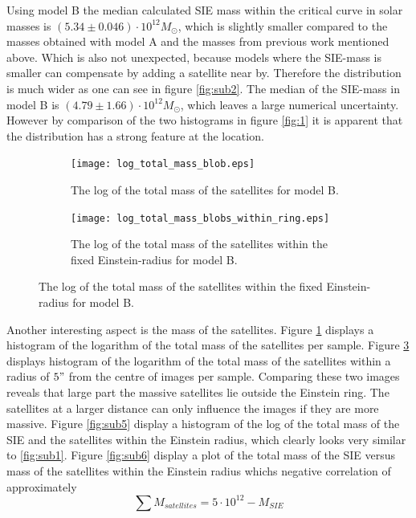 \documentclass[useAMS,usenatbib]{mn2e}
\begin{document}
Using model B the median calculated SIE mass within the critical curve in solar masses is  $(5.34 \pm 0.046) \cdot 10^{12} M_\odot$, %
which is slightly smaller compared to the masses obtained with model A and the masses from previous work mentioned above. Which is also not unexpected, because models where the SIE-mass is smaller can compensate by adding a satellite near by. Therefore the distribution is much wider as one can see in figure \ref{fig:sub2}. The median of the SIE-mass in model B is $(4.79 \pm 1.66) \cdot 10^{12} M_\odot$, which leaves a large numerical uncertainty. However by comparison of the two histograms in figure \ref{fig:1} it is apparent that the distribution has a strong feature at the location. \\
 
\begin{figure}[!h]
\hspace{5pt}
\begin{subfigure}{.45\textwidth}
  \centering
  \texttt{[image: log\_total\_mass\_blob.eps]}
\parbox{0.8\linewidth}{\caption{The log of the total mass of the satellites for model B.   \label{fig:sub3}}}
\end{subfigure}%
\hspace{-15pt}
\begin{subfigure}{.45\textwidth}
  \centering
  \vspace{6pt}
  \texttt{[image: log\_total\_mass\_blobs\_within\_ring.eps]}
\parbox{0.8\linewidth}{\caption{The log of the total mass of the satellites within the fixed Einstein-radius for model B.  \label{fig:sub4} }}
\end{subfigure}
   \end{figure}
\vspace{-15pt}
\noindent Another interesting aspect is the mass of the satellites. Figure \ref{fig:sub3} displays a histogram of the logarithm of the total mass of the satellites per sample. Figure \ref{fig:sub4} displays histogram of the logarithm of the total mass of the satellites within a radius of $ 5"$ from the centre of images per sample. Comparing these two images reveals that large part the massive satellites lie outside the Einstein ring. The satellites at a larger distance can only influence the images if they are more massive. Figure \ref{fig:sub5} display a histogram of the log of the total mass of the SIE and the satellites within the Einstein radius, which clearly looks very similar to \ref{fig:sub1}. 
Figure \ref{fig:sub6} display a plot of the total mass of the SIE versus mass of the satellites within the Einstein radius whichs  negative correlation of approximately 
\begin{equation}
 \sum M_{satellites} = 5\cdot10^{12} - M_{SIE}
 \end{equation}
\end{document}
